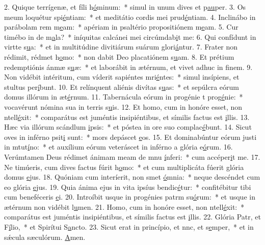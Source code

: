 2. Quique terrígenæ, et fíli h\uline{ó}minum:~* simul in unum dives et p\uline{au}per.
3. Os meum loquétur spi\uline{é}ntiam:~* et meditátio cordis mei prud\uline{é}ntiam.
4. Inclinábo in parábolam rem m\uline{e}am:~* apériam in psaltério propositiónem m\uline{e}am.
5. Cur timébo in de m\uline{a}la?~* iníquitas calcánei mei circúmdab\uline{i}t me:
6. Qui confídunt in virtte s\uline{u}a:~* et in multitúdine divitiárum suárum glori\uline{á}ntur.
7. Frater non rédimit, rédmet h\uline{o}mo:~* non dabit Deo placatiónem s\uline{u}am.
8. Et prétium redemptiónis ánmæ s\uline{u}æ:~* et laborábit in ætérnum, et vivet adhuc in f\uline{i}nem.
9. Non vidébit intéritum, cum víderit sapiéntes mri\uline{é}ntes:~* simul insípiens, et stultus per\uline{í}bunt.
10. Et relínquent aliénis divítas s\uline{u}as:~* et sepúlcra eórum domus illórum in æt\uline{é}rnum.
11. Tabernácula eórum in progénie t prog\uline{é}nie:~* vocavérunt nómina sua in terris s\uline{u}is.
12. Et homo, cum in honóre esset, non ntell\uline{é}xit:~* comparátus est juméntis insipiéntibus, et símilis factus est \uline{i}llis.
13. Hæc via illórum scándlum \uline{i}psis:~* et póstea in ore suo complac\uline{é}bunt.
14. Sicut oves in inférno psit\uline{i} sunt:~* mors depáscet \uline{e}os.
15. Et dominabúntur eórum justi in mtut\uline{í}no:~* et auxílium eórum veteráscet in inférno a glória e\uline{ó}rum.
16. Verúmtamen Deus rédimet ánimam meam de mnu \uline{í}nferi:~* cum accéper\uline{i}t me.
17. Ne timúeris, cum dives factus fúrit h\uline{o}mo:~* et cum multiplicáta fúerit glória domus \uline{e}jus.
18. Quóniam cum interíerit, non smet \uline{ó}mnia:~* neque descéndet cum eo glória \uline{e}jus.
19. Quia ánima ejus in vita ipsíus bendic\uline{é}tur:~* confitébitur tibi cum beneféceris \uline{e}i.
20. Introíbit usque in progénies patrm su\uline{ó}rum:~* et usque in ætérnum non vidébit l\uline{u}men.
21. Homo, cum in honóre esset, non ntell\uline{é}xit:~* comparátus est juméntis insipiéntibus, et símilis factus est \uline{i}llis.
22. Glória Patr, et F\uline{í}lio,~* et Spirítui S\uline{a}ncto.
23. Sicut erat in princípio, et nnc, et s\uline{e}mper,~* et in sǽcula sæculórum. \uline{A}men.
